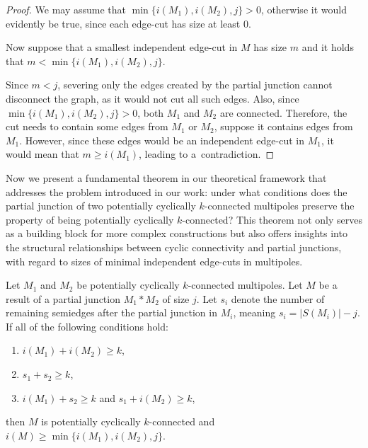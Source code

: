 \documentclass[12pt, twoside]{book}
\begin{document}
\begin{proof}
	We may assume that $\min\{i(M_1),i(M_2),j\}>0$, otherwise it would evidently be true, since each edge-cut has size at least 0.
	
	Now suppose that a smallest independent edge-cut in $M$ has size $m$ and it holds that ${m<\min\{i(M_1),i(M_2),j\}}$.
	
	Since $m<j$, severing only the edges created by the partial junction cannot disconnect the graph, as it would not cut all such edges. Also, since ${\min\{i(M_1),i(M_2),j\}>0}$, both $M_1$ and $M_2$ are connected. Therefore, the cut needs to contain some edges from $M_1$ or $M_2$, suppose it contains edges from $M_1$. However, since these edges would be an independent edge-cut in $M_1$, it would mean that $m\geq i(M_1)$, leading to a~contradiction.
\end{proof}

Now we present a fundamental theorem in our theoretical framework that addresses the problem introduced in our work: under what conditions does the partial junction of two potentially cyclically $k$-connected multipoles preserve the property of being potentially cyclically $k$-connected? This theorem not only serves as a building block for more complex constructions but also offers insights into the structural relationships between cyclic connectivity and partial junctions, with regard to sizes of minimal independent edge-cuts in multipoles.

\begin{theorem}\label{th:connecting-potentially-cyclically-connected-with-number-of-resulting-semiedges}
	Let $M_1$ and $M_2$ be potentially cyclically $k$-connected multipoles. Let $M$ be a result of a partial junction $M_1*M_2$ of size $j$. Let $s_i$ denote the number of remaining semiedges after the partial junction in $M_i$, meaning ${s_i=|S(M_i)|-j}$. If all of the following conditions hold:
	\begin{enumerate}[label=(\roman*)]
		\item $i(M_1)+i(M_2)\geq k$,\label{item:test}
		\item $s_1+s_2\geq k$,
		\item $i(M_1)+s_2\geq k$ and $s_1+i(M_2)\geq k$,
	\end{enumerate}
	then $M$ is potentially cyclically $k$-connected and $i(M)\geq \min\{i(M_1), i(M_2), j\}$.
\end{theorem}
\end{document}
